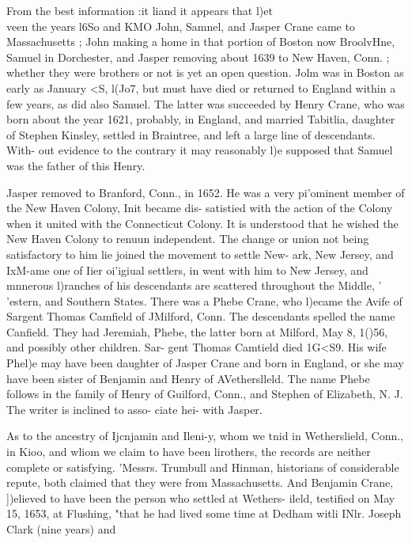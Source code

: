 \documentclass[oneside]{book}
\begin{document}
From the best information :it liand it appears that l)et\\veen the 
years l6So and KMO John, Samnel, and Jasper Crane came to 
Massachusetts ; John making a home in that portion of Boston 
now BroolvHne, Samuel in Dorchester, and Jasper removing 
about 1639 to New Haven, Conn. ; whether they were brothers 
or not is yet an open question. Jolm was in Boston as early as 
January <S, l(Jo7, but must have died or returned to England 
within a few years, as did also Samuel. The latter was succeeded 
by Henry Crane, who was born about the year 1621, probably, 
in England, and married Tabitlia, daughter of Stephen Kinsley, 
settled in Braintree, and left a large line of descendants. With- 
out evidence to the contrary it may reasonably l)e supposed that 
Samuel was the father of this Henry. 

Jasper removed to Branford, Conn., in 1652. He was a very 
pi'ominent member of the New Haven Colony, Init became dis- 
satistied with the action of the Colony when it united with the 
Connecticut Colony. It is understood that he wished the New 
Haven Colony to renuun independent. The change or union not 
being satisfactory to him lie joined the movement to settle New- 
ark, New Jersey, and IxM-ame one of Iier oi'igiual settlers, in 
went with him to New Jersey, and mnnerous l)ranches of his 
descendants are scattered throughout the Middle, '\\'estern, and 
Southern States. There was a Phebe Crane, who l)ecame the Avife 
of Sargent Thomas Camfield of JMilford, Conn. The descendants 
spelled the name Canfield. They had Jeremiah, Phebe, the latter 
born at Milford, May 8, 1()56, and possibly other children. Sar- 
gent Thomas Camtield died 1G<S9. His wife Phel)e may have 
been daughter of Jasper Crane and born in England, or she may 
have been sister of Benjamin and Henry of AVetherslleld. The 
name Phebe follows in the family of Henry of Guilford, Conn., 
and Stephen of Elizabeth, N. J. The writer is inclined to asso- 
ciate hei- with Jasper. 

As to the ancestry of Ijcnjamin and Ileni-y, whom we tnid in 
Wetherslield, Conn., in Kioo, and wliom we claim to have been 
lirothers, the records are neither complete or satisfying. 'Messrs. 
Trumbull and Hinman, historians of considerable repute, both 
claimed that they were from Massachusetts. And Benjamin 
Crane, ])elieved to have been the person who settled at Wethers- 
ileld, testified on May 15, 1653, at Flushing, "that he had lived 
some time at Dedham witli INlr. Joseph Clark (nine years) and 
\end{document}
